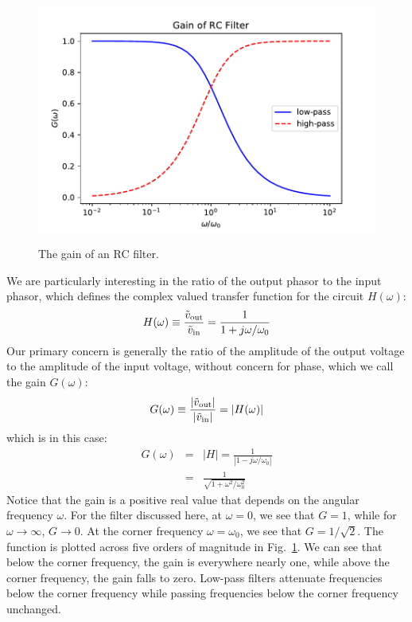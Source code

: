 \documentclass[12pt,oneside]{book}
\begin{document}
\begin{figure}[htbp]
\begin{center}
\includegraphics[height=0.3\textheight]{figs/rcgain.pdf} \\
\caption{ The gain of an RC filter.}
\label{fig:rcgain}
\end{center}
\end{figure}

We are particularly interesting in the ratio of the output phasor to the input phasor, which defines the complex valued transfer function for the circuit $H(\omega)$:
\begin{equation*}
H(\omega) \equiv \frac{\tilde{v}_{\rm out}}{\tilde{v}_{\rm in}} = \frac{1}{1 + j \omega/\omega_0}\\
\end{equation*}
Our primary concern is generally the ratio of the amplitude of the output voltage to the amplitude of the input voltage, without concern for phase, which we call the gain $G(\omega)$:
\begin{equation*}
G(\omega) \equiv \frac{|\tilde{v}_{\rm out}|}{|\tilde{v}_{\rm in}|} = |H(\omega)| 
\end{equation*}
which is in this case:
\begin{eqnarray*}
G(\omega) &=& |H| = \frac{1}{|1 - j \omega/\omega_0 |}\\
&=& \frac{1}{\sqrt{1+\omega^2/\omega_0^2}}
\end{eqnarray*}
Notice that the gain is a positive real value that depends on the angular frequency $\omega$.
For the filter discussed here, at $\omega=0$, we see that $G=1$, while for $\omega \to \infty$, $G \to 0$.
At the corner frequency $\omega = \omega_0$, we see that $G = 1/\sqrt{2}$.
The function is plotted across five orders of magnitude in Fig.~\ref{fig:rcgain}.
We can see that below the corner frequency, the gain is everywhere nearly one, while above the corner frequency, the gain falls to zero.  Low-pass filters attenuate frequencies below the corner frequency while passing frequencies below the corner frequency unchanged.
\end{document}
